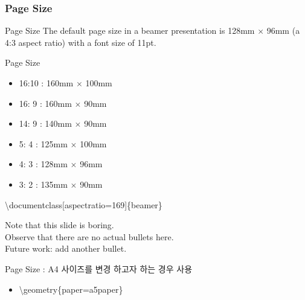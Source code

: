\documentclass[9pt,blue,xcolor=pdftex,dvipsnames,table,handout,notes]{beamer}
\begin{document}
		\begin{frame}[t]
		\frametitle{Page Size}



			\begin{block} {Page Size}
			The default page size 
			in a beamer presentation is 128mm $\times$ 96mm (a 4:3 aspect ratio) 
			with a font size of 11pt.
			\end{block}


			\begin{block}{Page Size}
			\begin{itemize}
			\item 16:10 : 160mm $\times$ 100mm
			\item 16: 9 : 160mm $\times$ 90mm
			\item 14: 9 : 140mm $\times$ 90mm
			\item  5: 4 : 125mm $\times$ 100mm
			\item  4: 3 : 128mm $\times$ 96mm
			\item  3: 2 : 135mm $\times$ 90mm
			\end{itemize}
			\end{block}


		

			\textbackslash documentclass[aspectratio=169]\{beamer\}


			Note that this slide is boring.\\
			Observe that there are no actual bullets here.\\
			Future work: add another bullet.\\

	

			\begin{block} {Page Size : A4  사이즈를 변경 하고자 하는 경우 사용 }
			\begin{itemize}
			\item[]	\textbackslash geometry\{paper=a5paper\}
			\end{itemize}
			\end{block}

		\end{frame}
\end{document}

